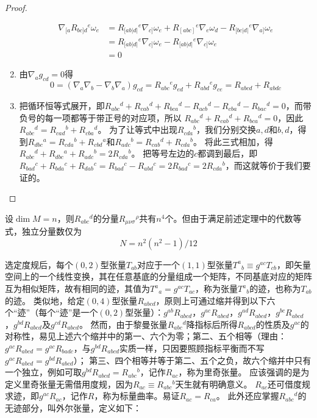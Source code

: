 \begin{proof}
\begin{enumerate}[（1）]
$$\begin{aligned}
\nabla_{[a}R_{bc]d}{}^e\omega_e & = R_{[ab|d|}{}^e\nabla_{c]}\omega_e + R_{[abc]}{}^e\nabla_e\omega_d - R_{[bc|d|}{}^e\nabla_{a]}\omega_e \\
& = R_{[ab|d|}{}^e\nabla_{c]}\omega_e - R_{[ab|d|}{}^e\nabla_{c]}\omega_e \\
& = 0
\end{aligned}$$
\item 由$\nabla_ag_{cd} = 0$得
$$0 = (\nabla_a\nabla_b - \nabla_b\nabla_a)g_{cd} = R_{abc}{}^eg_{ed} + R_{abd}{}^eg_{ce} = R_{abcd} + R_{abdc}$$
\item 把循环恒等式展开，即$R_{abc}{}^d + R_{cab}{}^d + R_{bca}{}^d - R_{acb}{}^d - R_{cba}{}^d - R_{bac}{}^d = 0$，而带负号的每一项都等于带正号的对应项，所以
$R_{abc}{}^d + R_{cab}{}^d + R_{bca}{}^d = 0$，因此$R_{abc}{}^d = R_{cad}{}^b + R_{cba}{}^d$。
为了让等式中出现$R_{cda}{}^b$，我们分别交换$a,d$和$b,d$，得到$R_{dbc}{}^a = R_{cda}{}^b + R_{cbd}{}^a$和$R_{adc}{}^b = R_{cab}{}^d + R_{cda}{}^b$。
将此三式相加，得$R_{abc}{}^d + R_{dbc}{}^a + R_{adc}{}^b = 2R_{cda}{}^b$。
把等号左边的$c$都调到最后，即$R_{bad}{}^c + R_{bda}{}^c + R_{dab}{}^c = R_{bad}{}^c - R_{abd}{}^c = 2R_{bad}{}^c = 2R_{cda}{}^b$，而这就等价于我们要证的。
\end{enumerate}
\end{proof}

\begin{note}
设$\dim M = n$，则$R_{abc}{}^d$的分量$R_{\mu\nu\sigma}{}^\rho$共有$n^4$个。但由于满足前述定理中的代数等式，独立分量数仅为
$$N = n^2(n^2 - 1) / 12$$
\end{note}

选定度规后，每个$(0, 2)$型张量$T_{ab}$对应于一个$(1, 1)$型张量$T^a{}_b \equiv g^{ac}T_{cb}$，即矢量空间上的一个线性变换，其在任意基底的分量组成一个矩阵，不同基底对应的矩阵互为相似矩阵，故有相同的迹，其值为$T^a{}_a = g^{ac}T_{ac}$，称为张量$T^a{}_b$的迹，也称为$T_{ab}$的迹。
类似地，给定$(0, 4)$型张量$R_{abcd}$，原则上可通过缩并得到以下六个``迹''（每个``迹''是一个$(0, 2)$型张量）：$g^{ab}R_{abcd}$，$g^{ac}R_{abcd}$，$g^{ad}R_{abcd}$，$g^{bc}R_{abcd}$，$g^{bd}R_{abcd}$及$g^{cd}R_{abcd}$。
然而，由于黎曼张量$R_{abc}{}^d$降指标后所得$R_{abcd}$的性质及$g^{ac}$的对称性，易见上述六个缩并中的第一、六个为零；第二、五个相等（理由：$g^{ac}R_{abcd} = g^{ac}R_{badc}$，与$g^{bd}R_{abcd}$实质一样，只因要照顾指标平衡而不写$g^{ac}R_{abcd} = g^{bd}R_{abcd}$）；
第三、四个相等并等于第二、五个之负，故六个缩并中只有一个独立，例如可取$g^{bd}R_{abcd} = R_{abc}{}^b$，记作$R_{ac}$，称为里奇张量。
应该强调的是为定义里奇张量无需借用度规，因为$R_{ac} \equiv R_{abc}{}^b$天生就有明确意义。
$R_{ac}$还可借度规求迹，即$g^{ac}R_{ac}$，记作$R$，称为标量曲率。易证$R_{ac} = R_{ca}$。
此外还应掌握$R_{abc}{}^d$的无迹部分，叫外尔张量，定义如下：


